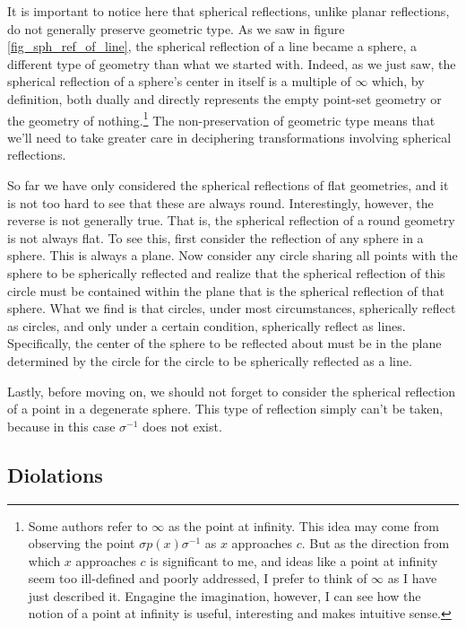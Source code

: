 \documentclass[12pt]{article}
\newcommand{\nvai}{\infty}
\begin{document}
It is important to notice here that spherical reflections, unlike planar reflections, do
not generally preserve geometric type.  As we saw in figure \ref{fig_sph_ref_of_line},
the spherical reflection of a line became a sphere, a different type of geometry than
what we started with.  Indeed, as we just saw, the spherical reflection of a sphere's
center in itself is a multiple of $\nvai$ which, by definition, both dually and directly represents
the empty point-set geometry or the geometry of nothing.\footnote{Some authors refer to $\nvai$ as the point at
infinity.  This idea may come from observing the point $\sigma p(x)\sigma^{-1}$ as $x$
approaches $c$.  But as the direction from which $x$ approaches $c$ is significant to me,
and ideas like a point at infinity seem too ill-defined and poorly addressed, I prefer to think of $\nvai$
as I have just described it.  Engagine the imagination, however, I can see how the notion of
a point at infinity is useful, interesting and makes intuitive sense.}  The non-preservation of geometric type means that we'll need
to take greater care in deciphering transformations involving spherical reflections.

So far we have only considered the spherical reflections of flat geometries, and it is
not too hard to see that these are always round.  Interestingly, however, the reverse
is not generally true.  That is, the spherical reflection of a round geometry is not
always flat.  To see this, first consider the reflection of any sphere in a sphere.
This is always a plane.  Now consider any circle sharing all points with the sphere to be
spherically reflected and realize that the spherical reflection of this circle must be
contained within the plane that is the spherical reflection of that sphere.  What we find is
that circles, under most circumstances, spherically reflect as circles, and only
under a certain condition, spherically reflect as lines.  Specifically, the center
of the sphere to be reflected about must be in the plane determined by the
circle for the circle to be spherically reflected as a line.

Lastly, before moving on, we should not forget to
consider the spherical reflection of a point in a degenerate sphere.  This
type of reflection simply can't be taken, because in this case $\sigma^{-1}$ does not exist.

\subsection{Diolations}
\end{document}
